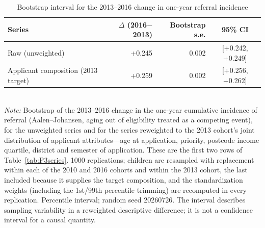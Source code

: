 \begin{table}[htbp]\centering
\caption{Bootstrap interval for the 2013--2016 change in one-year referral incidence}
\label{tab:P3boot}
\footnotesize
\setlength{\tabcolsep}{6pt}
\begin{tabular}{lrrc}
\toprule
Series & $\Delta$ (2016$-$2013) & Bootstrap s.e. & 95\% CI \\
\midrule
Raw (unweighted) & +0.245 & 0.002 & [+0.242, +0.249] \\
Applicant composition (2013 target) & +0.259 & 0.002 & [+0.256, +0.262] \\
\bottomrule
\end{tabular}
\\[3pt]{\footnotesize \textit{Note:} Bootstrap of the 2013--2016 change in the one-year cumulative incidence of referral (Aalen--Johansen, aging out of eligibility treated as a competing event), for the unweighted series and for the series reweighted to the 2013 cohort's joint distribution of applicant attributes---age at application, priority, postcode income quartile, district and semester of application. These are the first two rows of Table~\ref{tab:P3series}. 1000 replications; children are resampled with replacement within each of the 2010 and 2016 cohorts and within the 2013 cohort, the last included because it supplies the target composition, and the standardization weights (including the 1st/99th percentile trimming) are recomputed in every replication. Percentile interval; random seed 20260726. The interval describes sampling variability in a reweighted descriptive difference; it is not a confidence interval for a causal quantity.}
\end{table}
